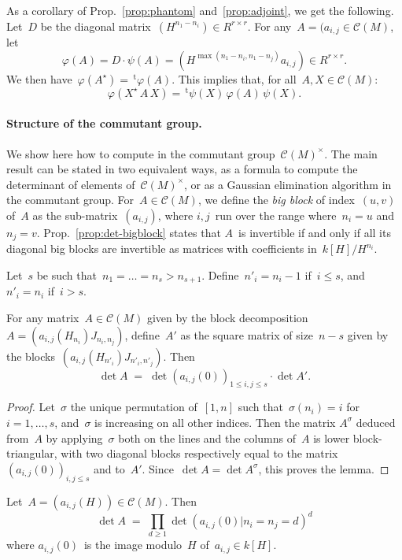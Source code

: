 \documentclass{lms}%
\let\ro\mathscr
\def\transpose{\,{}^{\mathrm{t}\!}}
\begin{document}
As a corollary of Prop.~\ref{prop:phantom} and~\ref{prop:adjoint}, we get
the following. Let~$D$ be the diagonal matrix~$(H^{n_1-n_i}) ∈ R^{r×r}$.
For any~$A = (a_{i,j}∈ \ro C(M)$, let
\begin{equation}
φ(A) = D · ψ(A) = (H^{\max (n_1-n_i,n_1-n_j)}a_{i,j}) ∈ R^{r×r}.
\end{equation}
We then have~$φ(A^{⋆}) = \transpose{φ(A)}$. This implies that, for
all~$A, X ∈ \ro C(M)$:
\begin{equation}\label{eq:phi-psi}
φ(X^{⋆}\,A\,X) = \transpose{ψ(X)}\, φ(A)\, ψ(X).
\end{equation}

\paragraph{Structure of the commutant group.}%

We show here how to compute in the commutant group~$\ro C(M)^{×}$. The
main result can be stated in two equivalent ways, as a formula to compute
the determinant of elements of~$\ro C(M)^{×}$, or as a Gaussian
elimination algorithm in the commutant group. For~$A ∈ \ro C(M)$, we
define the \emph{big block} of index~$(u,v)$ of~$A$ as the
sub-matrix~$(a_{i,j})$, where $i,j$~run over the range where~$n_i = u$
and~$n_j = v$. Prop.~\ref{prop:det-bigblock} states that $A$~is
invertible if and only if all its diagonal big blocks are invertible as
matrices with coefficients in~$k[H]/H^{n_i}$.

\begin{lem}\label{lem:det-1block}%
Let~$s$ be such that~$n_1 = … = n_s > n_{s+1}$.
Define~$n'_i = n_i - 1$ if~$i ≤ s$, and~$n'_i = n_i$ if~$i > s$.

For any matrix~$A ∈ \ro C(M)$ given by the block decomposition~$A =
(a_{i,j}(H_{n_i}) J_{n_i,n_j})$, define~$A'$ as the square matrix of
size~$n - s$ given by the blocks~$(a_{i,j}(H_{n'_i}) J_{n'_i,
n'_j})$.
Then \[ \det A \;=\; \det (a_{i,j}(0))_{1 ≤ i,j ≤ s} · \det A'. \]
\end{lem}

\begin{proof}
Let~$σ$ the unique permutation of~$[1,n]$ such that~$σ(n_i) = i$ for~$i =
1, …, s$, and~$σ$ is increasing on all other indices. Then the matrix
$A^{σ}$ deduced from~$A$ by applying~$σ$ both on the lines and the
columns of~$A$ is lower block-triangular, with two diagonal blocks
respectively equal to the matrix~$(a_{i,j}(0))_{i,j ≤ s}$ and to~$A'$.
Since~$\det A = \det A^{σ}$, this proves the lemma.
\end{proof}
\begin{prop}\label{prop:det-bigblock}%
Let~$A = (a_{i,j}(H)) ∈ \ro C(M)$. Then
\[ \det A \;=\; ∏_{d ≥ 1} \det (a_{i,j}(0) | n_{i} = n_j = d)^{d} \]
where $a_{i,j}(0)$~is the image modulo~$H$ of~$a_{i,j} ∈ k[H]$.
\end{prop}
\end{document}
